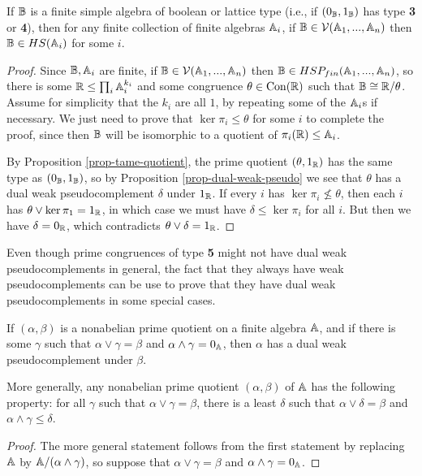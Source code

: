 \begin{appendices}
\begin{prop} If $\mathbb{B}$ is a finite simple algebra of boolean or lattice type (i.e., if $(0_{\mathbb{B}},1_{\mathbb{B}})$ has type \textbf{3} or \textbf{4}), then for any finite collection of finite algebras $\mathbb{A}_i$, if $\mathbb{B} \in \mathcal{V}(\mathbb{A}_1, ..., \mathbb{A}_n)$ then $\mathbb{B} \in HS(\mathbb{A}_i)$ for some $i$.
\end{prop}
\begin{proof} Since $\mathbb{B}, \mathbb{A}_i$ are finite, if $\mathbb{B} \in \mathcal{V}(\mathbb{A}_1, ..., \mathbb{A}_n)$ then $\mathbb{B} \in HSP_{fin}(\mathbb{A}_1, ..., \mathbb{A}_n)$, so there is some $\mathbb{R} \le \prod_i \mathbb{A}_i^{k_i}$ and some congruence $\theta \in \operatorname{Con}(\mathbb{R})$ such that $\mathbb{B} \cong \mathbb{R}/\theta$. Assume for simplicity that the $k_i$ are all $1$, by repeating some of the $\mathbb{A}_i$s if necessary. We just need to prove that $\ker \pi_i \le \theta$ for some $i$ to complete the proof, since then $\mathbb{B}$ will be isomorphic to a quotient of $\pi_i(\mathbb{R}) \le \mathbb{A}_i$.

By Proposition \ref{prop-tame-quotient}, the prime quotient $(\theta,1_{\mathbb{R}})$ has the same type as $(0_{\mathbb{B}},1_{\mathbb{B}})$, so by Proposition \ref{prop-dual-weak-pseudo} we see that $\theta$ has a dual weak pseudocomplement $\delta$ under $1_{\mathbb{R}}$. If every $i$ has $\ker \pi_i \not\le \theta$, then each $i$ has $\theta \vee \ker \pi_1 = 1_{\mathbb{R}}$, in which case we must have $\delta \le \ker \pi_i$ for all $i$. But then we have $\delta = 0_{\mathbb{R}}$, which contradicts $\theta \vee \delta = 1_{\mathbb{R}}$.
\end{proof}

Even though prime congruences of type \textbf{5} might not have dual weak pseudocomplements in general, the fact that they always have weak pseudocomplements can be use to prove that they have dual weak pseudocomplements in some special cases.

\begin{prop} If $(\alpha,\beta)$ is a nonabelian prime quotient on a finite algebra $\mathbb{A}$, and if there is some $\gamma$ such that $\alpha \vee \gamma = \beta$ and $\alpha \wedge \gamma = 0_{\mathbb{A}}$, then $\alpha$ has a dual weak pseudocomplement under $\beta$.

More generally, any nonabelian prime quotient $(\alpha,\beta)$ of $\mathbb{A}$ has the following property: for all $\gamma$ such that $\alpha \vee \gamma = \beta$, there is a least $\delta$ such that $\alpha \vee \delta = \beta$ and $\alpha \wedge \gamma \le \delta$.
\end{prop}
\begin{proof} The more general statement follows from the first statement by replacing $\mathbb{A}$ by $\mathbb{A}/(\alpha \wedge \gamma)$, so suppose that $\alpha \vee \gamma = \beta$ and $\alpha \wedge \gamma = 0_{\mathbb{A}}$.


\end{proof}
\end{appendices}
